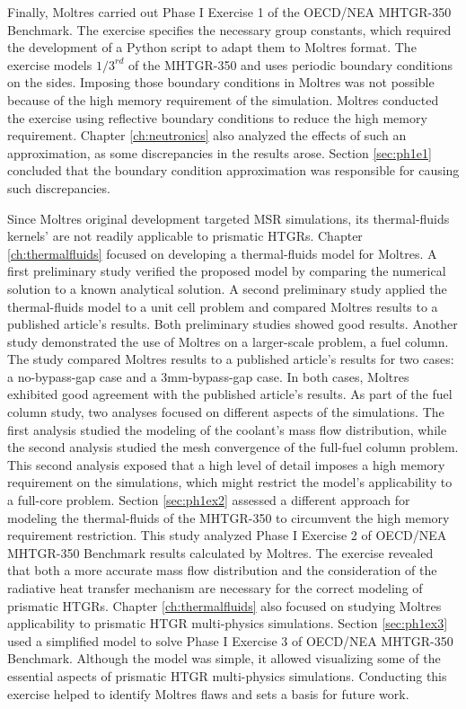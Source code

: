 Finally, Moltres carried out Phase I Exercise 1 of the OECD/NEA MHTGR-350 Benchmark.
The exercise specifies the necessary group constants, which required the development of a Python script to adapt them to Moltres format.
The exercise models $1/3^{rd}$ of the MHTGR-350 and uses periodic boundary conditions on the sides.
Imposing those boundary conditions in Moltres was not possible because of the high memory requirement of the simulation.
Moltres conducted the exercise using reflective boundary conditions to reduce the high memory requirement.
Chapter \ref{ch:neutronics} also analyzed the effects of such an approximation, as some discrepancies in the results arose.
Section \ref{sec:ph1e1} concluded that the boundary condition approximation was responsible for causing such discrepancies.

Since Moltres original development targeted MSR simulations, its thermal-fluids kernels' are not readily applicable to prismatic HTGRs.
Chapter \ref{ch:thermalfluids} focused on developing a thermal-fluids model for Moltres.
A first preliminary study verified the proposed model by comparing the numerical solution to a known analytical solution.
A second preliminary study applied the thermal-fluids model to a unit cell problem and compared Moltres results to a published article's results.
Both preliminary studies showed good results.
Another study demonstrated the use of Moltres on a larger-scale problem, a fuel column.
The study compared Moltres results to a published article's results for two cases: a no-bypass-gap case and a 3mm-bypass-gap case.
In both cases, Moltres exhibited good agreement with the published article's results.
As part of the fuel column study, two analyses focused on different aspects of the simulations.
The first analysis studied the modeling of the coolant's mass flow distribution, while the second analysis studied the mesh convergence of the full-fuel column problem.
This second analysis exposed that a high level of detail imposes a high memory requirement on the simulations, which might restrict the model's applicability to a full-core problem.
Section \ref{sec:ph1ex2} assessed a different approach for modeling the thermal-fluids of the MHTGR-350 to circumvent the high memory requirement restriction.
This study analyzed Phase I Exercise 2 of OECD/NEA MHTGR-350 Benchmark results calculated by Moltres.
The exercise revealed that both a more accurate mass flow distribution and the consideration of the radiative heat transfer mechanism are necessary for the correct modeling of prismatic HTGRs.
Chapter \ref{ch:thermalfluids} also focused on studying Moltres applicability to prismatic HTGR multi-physics simulations.
Section \ref{sec:ph1ex3} used a simplified model to solve Phase I Exercise 3 of OECD/NEA MHTGR-350 Benchmark.
Although the model was simple, it allowed visualizing some of the essential aspects of prismatic HTGR multi-physics simulations.
Conducting this exercise helped to identify Moltres flaws and sets a basis for future work.

